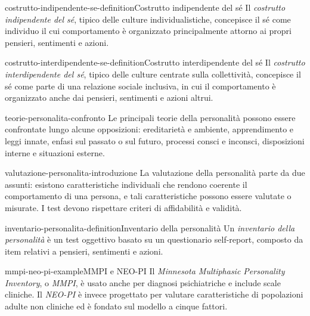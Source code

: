 \documentclass[preview]{standalone}
\begin{document}
\begin{snippetdefinition}{costrutto-indipendente-se-definition}{Costrutto indipendente del sé}
    Il \emph{costrutto indipendente del sé}, tipico delle culture
    individualistiche, concepisce il sé come individuo il cui comportamento è
    organizzato principalmente attorno ai propri pensieri, sentimenti e azioni.
\end{snippetdefinition}

\begin{snippetdefinition}{costrutto-interdipendente-se-definition}{Costrutto interdipendente del sé}
    Il \emph{costrutto interdipendente del sé}, tipico delle culture centrate
    sulla collettività, concepisce il sé come parte di una relazione sociale
    inclusiva, in cui il comportamento è organizzato anche dai pensieri,
    sentimenti e azioni altrui.
\end{snippetdefinition}

\begin{snippet}{teorie-personalita-confronto}
    Le principali teorie della personalità possono essere confrontate lungo
    alcune opposizioni: ereditarietà e ambiente, apprendimento e leggi innate,
    enfasi sul passato o sul futuro, processi consci e inconsci, disposizioni
    interne e situazioni esterne.
\end{snippet}

\begin{snippet}{valutazione-personalita-introduzione}
    La valutazione della personalità parte da due assunti: esistono
    caratteristiche individuali che rendono coerente il comportamento di una
    persona, e tali caratteristiche possono essere valutate o misurate. I test
    devono rispettare criteri di affidabilità e validità.
\end{snippet}

\begin{snippetdefinition}{inventario-personalita-definition}{Inventario della personalità}
    Un \emph{inventario della personalità} è un test oggettivo basato su un
    questionario self-report, composto da item relativi a pensieri, sentimenti e
    azioni.
\end{snippetdefinition}

\begin{snippetexample}{mmpi-neo-pi-example}{MMPI e NEO-PI}
    Il \emph{Minnesota Multiphasic Personality Inventory}, o \emph{MMPI}, è
    usato anche per diagnosi psichiatriche e include scale cliniche. Il
    \emph{NEO-PI} è invece progettato per valutare caratteristiche di
    popolazioni adulte non cliniche ed è fondato sul modello a cinque fattori.
\end{snippetexample}
\end{document}
